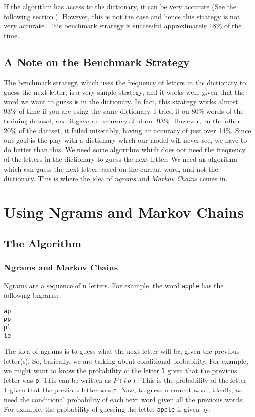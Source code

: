 \documentclass[12pt]{article}
\begin{document}
If the algorithm has access to the dictionary, it can be very accurate (See the following section.). However, this is not the case and hence this strategy is not very accurate. This benchmark strategy is successful approximately 18\% of the time.

\subsection{A Note on the Benchmark Strategy}
The benchmark strategy, which uses the frequency of letters in the dictionary to guess the next letter, is a very simple strategy, and it works well, given that the word we want to guess is in the dictionary. In fact, this strategy works almost 93\% of time if you are using the same dictionary. I tried it on 80\% words of the training dataset, and it gave an accuracy of about 93\%. However, on the other 20\% of the dataset, it failed miserably, having an accuracy of just over 14\%. Since out goal is the play with a dictionary which our model will never see, we have to do better than this. We need some algorithm which does not need the frequency of the letters in the dictionary to guess the next letter. We need an algorithm which can guess the next letter based on the current word, and not the dictionary. This is where the idea of \textit{ngrams} and \textit{Markov Chains} comes in.


\section{Using Ngrams and Markov Chains}
\subsection{The Algorithm}

\subsubsection{Ngrams and Markov Chains}
Ngrams are a sequence of n letters. For example, the word \verb|apple| has the following bigrams:
\begin{verbatim}
ap
pp
pl
le
\end{verbatim}
The idea of ngrams is to guess what the next letter will be, given the previous letter(s). So, basically, we are talking about conditional probability. For example, we might want to know the probability of the letter \verb|l| given that the previous letter was \verb|p|. This can be written as $P(l|p)$. This is the probability of the letter \verb|l| given that the previous letter was \verb|p|. Now, to guess a correct word, ideally, we need the conditional probability of each next word given all the previous words. For example, the probability of guessing the letter \verb|apple| is given by:
\end{document}
